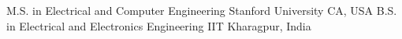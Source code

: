 

\begin{cventries}

  \cventryNoDescription
    {M.S. in Electrical and Computer Engineering} %
    {Stanford University} %
    {CA, USA} %
    {} %
  \cventryNoDescription
    {B.S. in Electrical and Electronics Engineering} %
    {IIT} %
    {Kharagpur, India} %
    {} %


\end{cventries}
